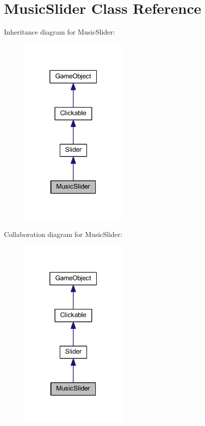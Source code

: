\hypertarget{class_music_slider}{\section{Music\+Slider Class Reference}
\label{class_music_slider}
}


Inheritance diagram for Music\+Slider\+:\nopagebreak
\begin{figure}[H]
\begin{center}
\leavevmode
\includegraphics[width=151pt]{class_music_slider__inherit__graph}
\end{center}
\end{figure}


Collaboration diagram for Music\+Slider\+:\nopagebreak
\begin{figure}[H]
\begin{center}
\leavevmode
\includegraphics[width=151pt]{class_music_slider__coll__graph}
\end{center}
\end{figure}
